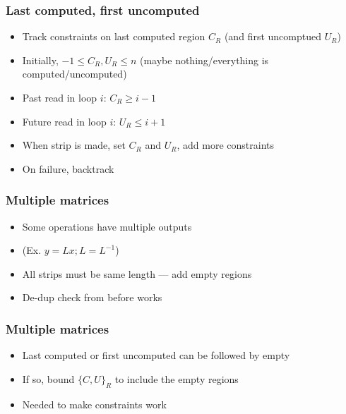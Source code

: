 \documentclass{beamer}
\newcommand*{\bracelabel}[4]{\draw (#1) to[brace #3]%
  node[midway,label={[dim-label]#3:#4}] {} (#2)}
\newcommand*{\emptyreg}[1]{\draw (#1.north west) -- (#1.south east) (#1.south west) -- (#1.north east)}
\begin{document}
\begin{frame}
  \frametitle{Last computed, first uncomputed}
  \begin{itemize}
  \item Track constraints on last computed region $C_R$ (and first uncomptued $U_R$)
  \item Initially, $-1 \leq C_R, U_R \leq n$ (maybe nothing/everything is computed/uncomputed)
  \item Past read in loop $i$: $C_R \geq i - 1$
  \item Future read in loop $i$: $U_R \leq i + 1$
  \item When strip is made, set $C_R$ and $U_R$, add more constraints
  \item On failure, backtrack
  \end{itemize}
\end{frame}

\begin{frame}
  \frametitle{Multiple matrices}
  \begin{itemize}
  \item Some operations have multiple outputs
  \item (Ex. $y = Lx; L = L^{-1}$)
  \item All strips must be same length --- add empty regions
  \item De-dup check from before works
  \end{itemize}
\end{frame}

\begin{frame}
  \frametitle{Multiple matrices}
  \begin{itemize}
  \item Last computed or first uncomputed can be followed by empty
  \item If so, bound $\{C, U\}_R$ to include the empty regions
  \item Needed to make constraints work
  \end{itemize}
\end{frame}
\end{document}
